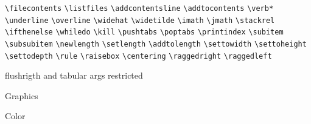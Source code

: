 \documentclass[12pt]{article}
\begin{document}
\verb+\filecontents+
\verb+\listfiles+
\verb+\addcontentsline+
\verb+\addtocontents+
\verb+\verb*+
\verb+\underline+
\verb+\overline+
\verb+\widehat+
\verb+\widetilde+
\verb+\imath+
\verb+\jmath+
\verb+\stackrel+
\verb+\ifthenelse+
\verb+\whiledo+
\verb+\kill+
\verb+\pushtabs+
\verb+\poptabs+
\verb+\printindex+
\verb+\subitem+
\verb+\subsubitem+
\verb+\newlength+
\verb+\setlength+
\verb+\addtolength+
\verb+\settowidth+
\verb+\settoheight+
\verb+\settodepth+
\verb+\rule+
\verb+\raisebox+
\verb+\centering+
\verb+\raggedright+
\verb+\raggedleft+

flushrigth and tabular args restricted

Graphics

Color

\newpage

%


\small
\printindex
\end{document}

